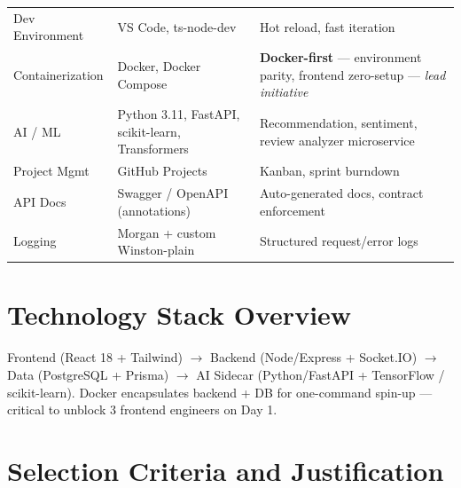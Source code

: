 \begin{table}[H]
\begin{tabularx}{\textwidth}{@{}p{}p{}p{}@{}}
Dev Environment & VS Code, ts-node-dev & Hot reload, fast iteration \\

Containerization & Docker, Docker Compose & \textbf{Docker-first} --- environment parity, frontend zero-setup --- \textit{lead initiative} \\

AI / ML & Python 3.11, FastAPI, scikit-learn, Transformers & Recommendation, sentiment, review analyzer microservice \\

Project Mgmt & GitHub Projects & Kanban, sprint burndown \\

API Docs & Swagger / OpenAPI (annotations) & Auto-generated docs, contract enforcement \\

Logging & Morgan + custom Winston-plain & Structured request/error logs \\

\bottomrule
\end{tabularx}
\end{table}

\section{Technology Stack Overview}

Frontend (React 18 + Tailwind) $\rightarrow$ Backend (Node/Express + Socket.IO) $\rightarrow$ Data (PostgreSQL + Prisma) $\rightarrow$ AI Sidecar (Python/FastAPI + TensorFlow / scikit-learn). Docker encapsulates backend + DB for one-command spin-up --- critical to unblock 3 frontend engineers on Day 1.

\section{Selection Criteria and Justification}

